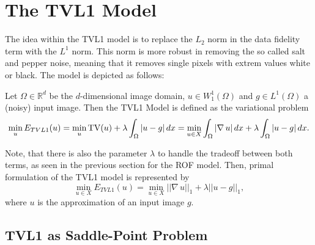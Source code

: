 \section{The TVL1 Model} %
\label{sec:the_tvl1_model}
    
    The idea within the TVL1 model is to replace the $L_{2}$ norm in the data fidelity term with the $L^{1}$ norm. This norm is more robust in removing the so called salt and pepper noise, meaning that it removes single pixels with extrem values white or black. The model is depicted as follows:

    \begin{definition} %
    \label{def:the_tvl1_model}

        Let $\Omega \in \mathbb{R}^{d}$ be the $d$-dimensional image domain, $u \in W_{1}^{1}(\Omega)$ and $g \in L^{1}(\Omega)$ a (noisy) input image. Then the TVL1 Model is defined as the variational problem
            \begin{equation}
                \min_{u} E_{TVL1}(u) = \min_{u} \textnormal{TV}(u) + \lambda \int_{\Omega} |u - g| \, dx = \min_{u \in X} \int_{\Omega} |\nabla \, u| \, dx + \lambda \int_{\Omega} |u - g| \, dx.
                \label{eq:the_tvl1_model}
            \end{equation}

    \end{definition}

    Note, that there is also the parameter $\lambda$ to handle the tradeoff between both terms, as seen in the previous section for the ROF model. Then, primal formulation of the TVL1 model is represented by
        \begin{equation}
            \min_{u \in X} E_{TVL1}(u) = \min_{u \in X} ||\nabla \, u||_{1} + \lambda ||u - g||_{1},
        \label{eq:primal_tvl1_problem}
        \end{equation}
    where $u$ is the approximation of an input image $g$.

    \subsection{TVL1 as Saddle-Point Problem} %
    \label{sub:tvl1_as_saddle_point_problem}


